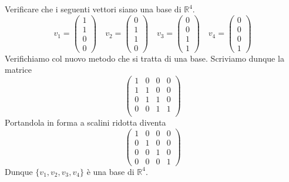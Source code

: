 \begin{example}
	Verificare che i seguenti vettori siano una base di $\mathbb{R}^4$.
	\begin{equation*}
		v_1 = \begin{pmatrix}
			1 \\ 1 \\ 0 \\ 0
		\end{pmatrix} \quad
		v_2 = \begin{pmatrix}
			0 \\ 1 \\ 1 \\ 0
		\end{pmatrix} \quad
		v_3 = \begin{pmatrix}
			0 \\ 0 \\ 1 \\ 1
		\end{pmatrix} \quad
		v_4 = \begin{pmatrix}
			0 \\ 0 \\ 0 \\ 1
		\end{pmatrix}
	\end{equation*}
	Verifichiamo col nuovo metodo che si tratta di una base.
	Scriviamo dunque la matrice
	\begin{equation*}
		\begin{pmatrix}
			1 & 0 & 0 & 0 \\
			1 & 1 & 0 & 0 \\
			0 & 1 & 1 & 0 \\
			0 & 0 & 1 & 1 \\
		\end{pmatrix}
	\end{equation*}
	Portandola in forma a scalini ridotta diventa
	\begin{equation*}
		\begin{pmatrix}
			1 & 0 & 0 & 0 \\
			0 & 1 & 0 & 0 \\
			0 & 0 & 1 & 0 \\
			0 & 0 & 0 & 1
		\end{pmatrix}
	\end{equation*}
	Dunque $\{v_1, v_2, v_3, v_4\}$ \`e una base di $\mathbb{R}^4$.
\end{example}

